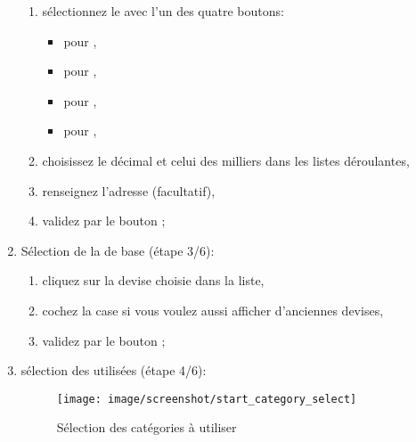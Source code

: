 \begin{enumerate}
		\begin{enumerate}[resume]		%
			\item sélectionnez le  avec l'un des quatre boutons:
				\begin{itemize}	
				\item[\textopenbullet]  pour ,
				\item[\textopenbullet]  pour ,
				\item[\textopenbullet]  pour ,
				\item[\textopenbullet]  pour ,
				\end{itemize}
			\item choisissez le  décimal et celui des milliers dans les listes déroulantes,
			\item renseignez l'adresse (facultatif),
			\item validez par le bouton ;
		\end{enumerate}
		
	\item Sélection de la  de base (étape 3/6):
		\begin{enumerate} 
		 	\item cliquez sur la devise choisie dans la liste,
			\item cochez la case  si vous voulez aussi afficher d'anciennes devises,
			\item validez par le bouton ;
		\end{enumerate}

	\item sélection des  utilisées (étape 4/6):
	
\begin{figure}[htbp]
	\begin{center}
		\texttt{[image: image/screenshot/start\_category\_select]}
	\end{center}
	\caption{Sélection des catégories à utiliser}
	\label{start_category_select}
\end{figure}
		

\end{enumerate}
